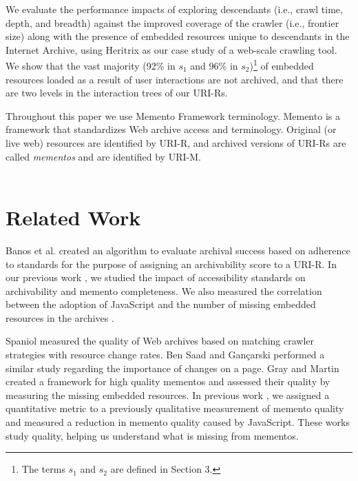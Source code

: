\documentclass{sig-alternate}
\begin{document}

We evaluate the performance impacts of exploring descendants (i.e., crawl time, depth, and breadth) against the improved coverage of the crawler (i.e., frontier size) along with the presence of embedded resources unique to descendants in the Internet Archive, using Heritrix as our case study of a web-scale crawling tool. We show that the vast majority (92\% in $s_1$ and 96\% in $s_2$)\footnote{The terms $s_1$ and $s_2$ are defined in Section 3.} of embedded resources loaded as a result of user interactions are not archived, and that there are two levels in the interaction trees of our URI-Rs.

Throughout this paper we use Memento Framework terminology. Memento \cite{nelson:memento:tr, mementorfc} is a framework that standardizes Web archive access and terminology. Original (or live web) resources are identified by URI-R, and archived versions of URI-Rs are called \emph{mementos} and are identified by URI-M. 
\\\\

\section{Related Work}
\label{priorwork}
Banos et al. \cite{ipresArchivability} created an algorithm to evaluate archival success based on adherence to standards for the purpose of assigning an archivability score to a URI-R. In our previous work \cite{kellyTPDL2013}, we studied the impact of accessibility standards on archivability and memento completeness. We also measured the correlation between the adoption of JavaScript and the number of missing embedded resources in the archives \cite{ijdl}. 

Spaniol \cite{spaniol9catch, spaniol2009data, Denev:2009:SFQ:1687627.1687694} measured the quality of Web archives based on matching crawler strategies with resource change rates. Ben Saad and Gan\c{c}arski \cite{saad2011} performed a similar study regarding the importance of changes on a page. Gray and Martin \cite{mementoQuality} created a framework for high quality mementos and assessed their quality by measuring the missing embedded resources. In previous work \cite{brunelleDamage}, we assigned a quantitative metric to a previously qualitative measurement of memento quality and measured a reduction in memento quality caused by JavaScript. These works study quality, helping us understand what is missing from mementos.
\end{document}
